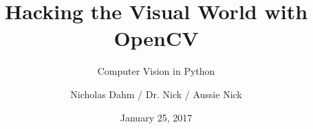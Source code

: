 \documentclass[xcolor=usenames]{beamer}
\title[Hacking the Visual World]{Hacking the Visual World with OpenCV}
\subtitle{Computer Vision in Python}
\date{January 25, 2017}
\author[Dr. Nick]{Nicholas Dahm / Dr. Nick / Aussie Nick}
\institute{TrademarkVision}
\begin{document}
\begin{frame}
	\titlepage
\end{frame}
\end{document}
